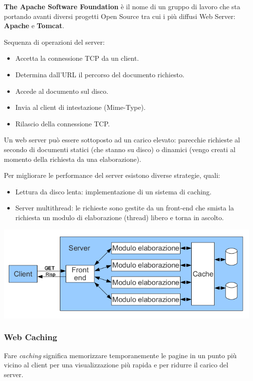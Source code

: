             \textbf{The Apache Software Foundation} è il nome di un gruppo di lavoro che sta portando avanti diversi progetti Open Source tra cui i più diffusi Web Server: \textbf{Apache} e \textbf{Tomcat}.
        
            Sequenza di operazioni del server:
            \begin{itemize}
                \item Accetta la connessione TCP da un client.
                \item Determina dall'URL il percorso del documento richiesto.
                \item Accede al documento sul disco.
                \item Invia al client di intestazione (Mime-Type).
                \item Rilascio della connessione TCP.
            \end{itemize}

            Un web server può essere sottoposto ad un carico elevato: parecchie richieste al secondo di documenti statici (che stanno su disco) o dinamici (vengo creati al momento della richiesta da una elaborazione).

            Per migliorare le performance del server esistono diverse strategie, quali:
            \begin{itemize}
                \item Lettura da disco lenta: implementazione di un sistema di caching.
                \item Server multithread: le richieste sono gestite da un front-end che smista la richiesta un modulo di elaborazione (thread) libero e torna in ascolto.
            \end{itemize}

            \begin{center}
                \includegraphics[scale=0.4]{chapters/6/assets/schema_i.png}
            \end{center}

        \subsubsection{Web Caching}
            Fare \textit{caching} significa memorizzare temporanemente le pagine in un punto più vicino al client per una visualizzazione più rapida e per ridurre il carico del server.
            
